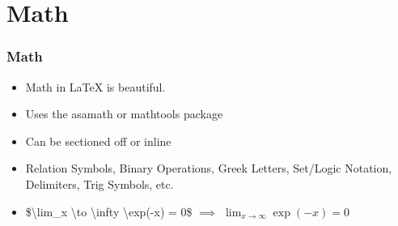 \section{Math}

\begin{frame}
\frametitle{Math}
\begin{itemize}
    \item Math in \LaTeX{} is beautiful.
    \item Uses the asamath or mathtools package
    \item Can be sectioned off or inline
    \item Relation Symbols, Binary Operations, Greek Letters, Set/Logic
        Notation, Delimiters, Trig Symbols, etc.
    \item \$\textbackslash{}lim_{x \textbackslash{}to \textbackslash{}infty} \textbackslash{}exp(-x) = 0\$ 
    $\implies$ $\lim_{x \to \infty} \exp(-x) = 0$
\end{itemize}
\end{frame}
